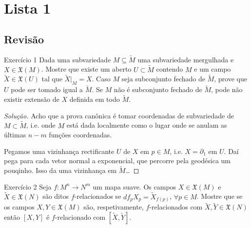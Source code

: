 \clearpage
\section{Lista 1}

\subsection{Revisão}

\begin{thing4}{Exercício 1}\label{exer:1}\leavevmode
Dada uma subvariedade \(M \subseteq \tilde{M}\) uma subvariedade mergulhada e \(X \in \mathfrak{X}(M)\). Mostre que existe um aberto \(U \subset \tilde{M}\) contendo \(M\) e um campo \(\tilde{X} \in \mathfrak{X}(U)\) tal que \(\tilde{X}|_{M}=X\). Caso \(M\) seja subconjunto fechado de \(\tilde{M}\), prove que \(U\) pode ser tomado igual a \(\tilde{M}\). Se \(M\) não é subconjunto fechado de \(\tilde{M}\), pode não existir extensão de \(X\) definida em todo \(\tilde{M}\).
\end{thing4}

\begin{proof}[Solução]\leavevmode
Acho que a prova canônica é tomar coordenadas de subvariedade de \(M \subset \tilde{M}\), i.e. onde \(M\) está dada localmente como o lugar onde se anulam as últimas \(n-m\) funções coordenadas. 

Pegamos uma vizinhança rectificante \(U\) de \(X\) em \(p \in M\), i.e. \(X=\partial_1\) em \(U\). Daí pega para cada vetor normal a exponencial, que percorre pela geodésica um pouqinho. Isso da uma vizinhança em \(\tilde{M}\)…
\end{proof}

\begin{thing4}{Exercício 2}\label{exer:2}\leavevmode
	Seja \(f:M^n \to N^m\) um mapa suave. Os campos \(X \in \mathfrak{X}(M)\) e \(\tilde{X} \in \mathfrak{X}(N)\) são ditos \(f\)-relacionados se \(df_pX_p=\tilde{X}_{f(p)}\), \(\forall  p \in M\). Mostre que se os campos \(X,Y \in \mathfrak{X}(M)\) são, respetivamente, \(f\)-relacionados com \(\tilde{X},\tilde{Y} \in \mathfrak{X}(N)\) então \([X,Y]\) é \(f\)-relacionado com \([\tilde{X},\tilde{Y}]\).
\end{thing4}

